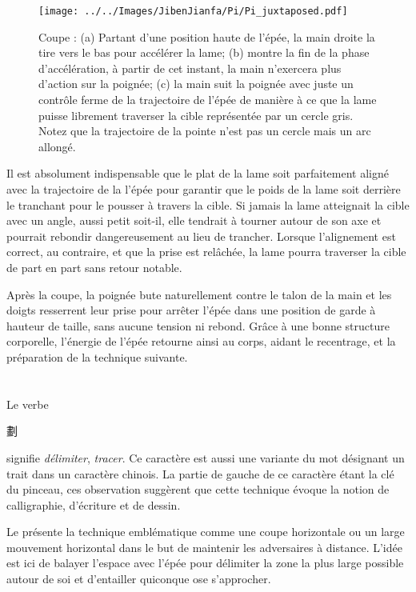 \begin{figure}[ht]
\centering
	\texttt{[image: ../../Images/JibenJianfa/Pi/Pi\_juxtaposed.pdf]}
	\caption[Coupe \Pi{}]{Coupe \Pi{} : (a) Partant d'une position haute de l'épée, la main droite la tire vers le bas pour accélérer la lame; (b) montre la fin de la phase d'accélération, à partir de cet instant, la main n'exercera plus d'action sur la poignée; (c) la main suit la poignée avec juste un contrôle ferme de la trajectoire de l'épée de manière à ce que la lame puisse librement traverser la cible représentée par un cercle gris. Notez que la trajectoire de la pointe n'est pas un cercle mais un arc allongé.}
	\label{fig:pi_cut}
\end{figure}

Il est absolument indispensable que le plat de la lame soit parfaitement aligné avec la trajectoire de la l'épée pour garantir que le poids de la lame soit derrière le tranchant pour le pousser à travers la cible. Si jamais la lame atteignait la cible avec un angle, aussi petit soit-il, elle tendrait à tourner autour de son axe et pourrait rebondir dangereusement au lieu de trancher. Lorsque l'alignement est correct, au contraire, et que la prise est relâchée, la lame pourra traverser la cible de part en part sans retour notable.

Après la coupe, la poignée bute naturellement contre le talon de la main et les doigts resserrent leur prise pour arrêter l'épée dans une position de garde à hauteur de taille, sans aucune tension ni rebond. Grâce à une bonne structure corporelle, l'énergie de l'épée retourne ainsi au corps, aidant le recentrage, et la préparation de la technique suivante.

\section{\Hua}
Le verbe \Hua{} \begin{CJK*}{UTF8}{bsmi}劃\end{CJK*} signifie \textit{délimiter}, \textit{tracer}. Ce caractère est aussi une variante du mot désignant un trait dans un caractère chinois.
La partie de gauche de ce caractère étant la clé du pinceau, ces observation suggèrent que cette technique évoque la notion de calligraphie, d'écriture et de dessin.

Le \Yangjia{} \Michuan{} présente la technique \Hua{} emblématique comme une coupe horizontale ou un large mouvement horizontal dans le but de maintenir les adversaires à distance. L'idée est ici de balayer l'espace avec l'épée pour délimiter la zone la plus large possible autour de soi et d'entailler quiconque ose s'approcher.


